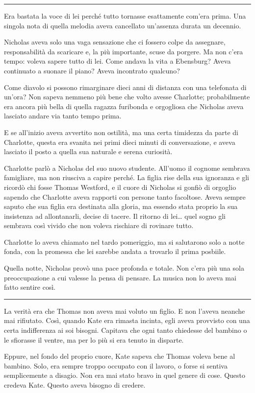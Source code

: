 \documentclass[a4paper,oneside,11pt]{memoir}
\begin{document}
\plainbreak{1}

Era bastata la voce di lei perché tutto tornasse esattamente com'era prima. Una singola nota di quella melodia aveva
cancellato un'assenza durata un decennio.

Nicholas aveva solo una vaga sensazione che ci fossero colpe da assegnare, responsabilità da scaricare e, la più
importante, scuse da porgere. Ma non c'era tempo: voleva sapere tutto di lei. Come andava la vita a Ebensburg? Aveva
continuato a suonare il piano? Aveva incontrato qualcuno?

Come diavolo si possono rimarginare dieci anni di distanza con una telefonata di un'ora? Non sapeva nemmeno più bene che
volto avesse Charlotte; probabilmente era ancora più bella di quella ragazza furibonda e orgogliosa che Nicholas aveva
lasciato andare via tanto tempo prima.

E se all'inizio aveva avvertito non ostilità, ma una certa timidezza da parte di Charlotte, questa era svanita nei primi
dieci minuti di conversazione, e aveva lasciato il posto a quella sua naturale e serena curiosità.

Charlotte parlò a Nicholas del suo nuovo studente. All'uomo il cognome sembrava famigliare, ma non riusciva a capire
perché. La figlia rise della sua ignoranza e gli ricordò chi fosse Thomas Westford, e il cuore di Nicholas si gonfiò di
orgoglio sapendo che Charlotte aveva rapporti con persone tanto facoltose. Aveva sempre saputo che sua figlia era
destinata alla gloria, ma essendo stata proprio la sua insistenza ad allontanarli, decise di tacere. Il ritorno di
lei\dots{} quel sogno gli sembrava così vivido che non voleva rischiare di rovinare tutto.

Charlotte lo aveva chiamato nel tardo pomeriggio, ma si salutarono solo a notte fonda, con la promessa che lei sarebbe
andata a trovarlo il prima posbiile.

Quella notte, Nicholas provò una pace profonda e totale. Non c'era più una sola preoccupazione a cui valesse la pensa di
pensare. La musica non lo aveva mai fatto sentire così.

\plainbreak{1}

La verità era che Thomas non aveva mai voluto un figlio. E non l'aveva neanche mai rifiutato. Così, quando Kate era
rimasta incinta, egli aveva provvisto con una certa indifferenza ai soi bisogni. Capitava che ogni tanto chiedesse del
bambino o le sfiorasse il ventre, ma per lo più si era tenuto in disparte.

Eppure, nel fondo del proprio cuore, Kate sapeva che Thomas voleva bene al bambino. Solo, era sempre troppo occupato con
il lavoro, o forse si sentiva semplicemente a disagio. Non era mai stato bravo in quel genere di cose. Questo credeva
Kate. Questo aveva bisogno di credere.
\end{document}
